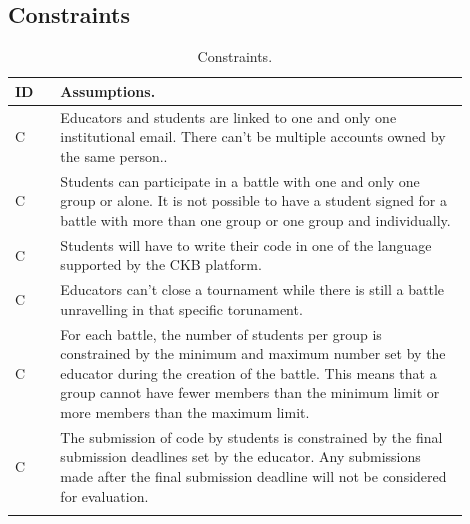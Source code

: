 \subsection{Constraints}

\setcounter{cc}{0}
\newcommand{\ccc}{\stepcounter{cc}\theac}

\newcommand{\ccrow}[1]{
    C\ccc & #1 \\
    \hline
}

\begin{center}
    \begin{longtable}{ |l|p{0.9\linewidth}| }
        \hline
        \textbf{ID} & \textbf{Assumptions}.                                   \\
        \hline
        C\ccc        & Educators and students are linked to one and only one institutional email. There can't be multiple accounts owned by the same person..                                  \\
        \hline
        C\ccc        & Students can participate in a battle with one and only one group or alone. It is not possible to have a student signed 
        for a battle with more than one group or one group and individually. \\
        \hline
        C\ccc        & Students will have to write their code in one of the language supported by the CKB platform.                                                             \\
        \hline
        C\ccc        & Educators can't close a tournament while there is still a battle unravelling in that specific torunament.                                  \\
        \hline
        C\ccc        & For each battle, the number of students per group is constrained by the minimum and maximum number set by 
        the educator during the creation of the battle. This means that a group cannot have fewer members 
        than the minimum limit or more members than the maximum limit.                      \\
        \hline
        C\ccc        & The submission of code by students is constrained by the final submission deadlines set by the educator. Any submissions made after the final submission deadline will not be considered for evaluation.                                                \\
        \hline
        \caption{Constraints.}
        \label{tab:constraints_tab}%
    \end{longtable}
\end{center}

